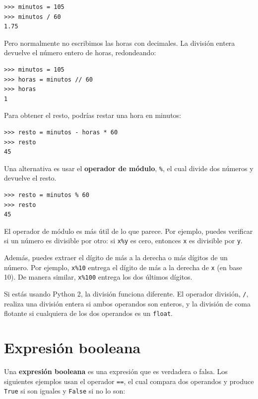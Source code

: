 \documentclass[10pt]{book}
\begin{document}
\begin{verbatim}
>>> minutos = 105
>>> minutos / 60
1.75
\end{verbatim}

Pero normalmente no escribimos las horas con decimales.  La división
entera devuelve el número entero de horas, redondeando:

\begin{verbatim}
>>> minutos = 105
>>> horas = minutos // 60
>>> horas
1
\end{verbatim}

Para obtener el resto, podrías restar una hora en minutos:

\begin{verbatim}
>>> resto = minutos - horas * 60
>>> resto
45
\end{verbatim}


Una alternativa es usar el {\bf operador de módulo}, \verb"%", el cual
divide dos números y devuelve el resto.

\begin{verbatim}
>>> resto = minutos % 60
>>> resto
45
\end{verbatim}
%
El operador de módulo es más útil de lo que parece.  Por
ejemplo, puedes verificar si un número es divisible por otro: si
{\tt x\%y} es cero, entonces {\tt x} es divisible por {\tt y}.

Además, puedes extraer el dígito de más a la derecha
o más dígitos de un número.  Por ejemplo, {\tt x\%10} entrega el
dígito de más a la derecha de {\tt x} (en base 10).  De manera similar, {\tt x\%100}
entrega los dos últimos dígitos.

Si estás usando Python 2, la división funciona diferente.  El
operador división, \verb"/", realiza una división entera si ambos
operandos son enteros, y la división de coma flotante si cualquiera de
los dos operandos es un {\tt float}.


\section{Expresión booleana}

Una {\bf expresión booleana} es una expresión que es verdadera
o falsa.  Los siguientes ejemplos usan el
operador {\tt ==}, el cual compara dos operandos y produce
{\tt True} si son iguales y {\tt False} si no lo son:
\end{document}
